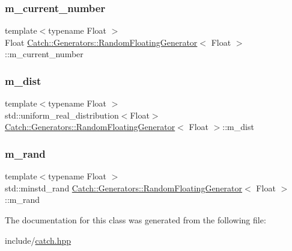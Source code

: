 \subsubsection{\texorpdfstring{m\_current\_number}{m\_current\_number}}
{\footnotesize\ttfamily template$<$typename Float $>$ \\
Float \mbox{\hyperlink{class_catch_1_1_generators_1_1_random_floating_generator}{Catch\+::\+Generators\+::\+Random\+Floating\+Generator}}$<$ Float $>$\+::m\+\_\+current\+\_\+number\hspace{0.3cm}{\ttfamily [private]}}

\mbox{\label{class_catch_1_1_generators_1_1_random_floating_generator_a6a79be0000a6c2a17e4f11dadb43c8ac}} 
\subsubsection{\texorpdfstring{m\_dist}{m\_dist}}
{\footnotesize\ttfamily template$<$typename Float $>$ \\
std\+::uniform\+\_\+real\+\_\+distribution$<$Float$>$ \mbox{\hyperlink{class_catch_1_1_generators_1_1_random_floating_generator}{Catch\+::\+Generators\+::\+Random\+Floating\+Generator}}$<$ Float $>$\+::m\+\_\+dist\hspace{0.3cm}{\ttfamily [private]}}

\mbox{\label{class_catch_1_1_generators_1_1_random_floating_generator_acbc83a5a9d8d0491b1f5b8b9a65a0a0b}} 
\subsubsection{\texorpdfstring{m\_rand}{m\_rand}}
{\footnotesize\ttfamily template$<$typename Float $>$ \\
std\+::minstd\+\_\+rand \mbox{\hyperlink{class_catch_1_1_generators_1_1_random_floating_generator}{Catch\+::\+Generators\+::\+Random\+Floating\+Generator}}$<$ Float $>$\+::m\+\_\+rand\hspace{0.3cm}{\ttfamily [private]}}



The documentation for this class was generated from the following file\+:\begin{DoxyCompactItemize}
\item 
include/\mbox{\hyperlink{catch_8hpp}{catch.\+hpp}}\end{DoxyCompactItemize}
